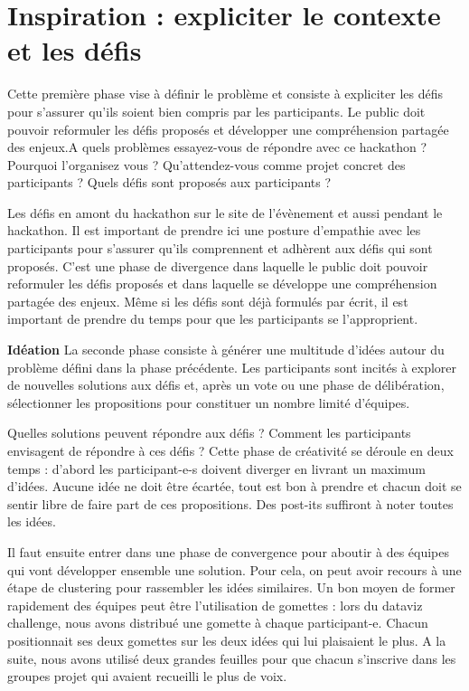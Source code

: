 \documentclass[]{book}
\begin{document}
\section{Inspiration : expliciter le contexte et les
défis}\label{inspiration-expliciter-le-contexte-et-les-defis}

Cette première phase vise à définir le problème et consiste à expliciter
les défis pour s'assurer qu'ils soient bien compris par les
participants. Le public doit pouvoir reformuler les défis proposés et
développer une compréhension partagée des enjeux.A quels problèmes
essayez-vous de répondre avec ce hackathon ? Pourquoi l'organisez vous ?
Qu'attendez-vous comme projet concret des participants ? Quels défis
sont proposés aux participants ?

Les défis en amont du hackathon sur le site de l'évènement et aussi
pendant le hackathon. Il est important de prendre ici une posture
d'empathie avec les participants pour s'assurer qu'ils comprennent et
adhèrent aux défis qui sont proposés. C'est une phase de divergence dans
laquelle le public doit pouvoir reformuler les défis proposés et dans
laquelle se développe une compréhension partagée des enjeux. Même si les
défis sont déjà formulés par écrit, il est important de prendre du temps
pour que les participants se l'approprient.

\textbf{Idéation} La seconde phase consiste à générer une multitude
d'idées autour du problème défini dans la phase précédente. Les
participants sont incités à explorer de nouvelles solutions aux défis
et, après un vote ou une phase de délibération, sélectionner les
propositions pour constituer un nombre limité d'équipes.

Quelles solutions peuvent répondre aux défis ? Comment les participants
envisagent de répondre à ces défis ? Cette phase de créativité se
déroule en deux temps : d'abord les participant-e-s doivent diverger en
livrant un maximum d'idées. Aucune idée ne doit être écartée, tout est
bon à prendre et chacun doit se sentir libre de faire part de ces
propositions. Des post-its suffiront à noter toutes les idées.

Il faut ensuite entrer dans une phase de convergence pour aboutir à des
équipes qui vont développer ensemble une solution. Pour cela, on peut
avoir recours à une étape de clustering pour rassembler les idées
similaires. Un bon moyen de former rapidement des équipes peut être
l'utilisation de gomettes : lors du dataviz challenge, nous avons
distribué une gomette à chaque participant-e. Chacun positionnait ses
deux gomettes sur les deux idées qui lui plaisaient le plus. A la suite,
nous avons utilisé deux grandes feuilles pour que chacun s'inscrive dans
les groupes projet qui avaient recueilli le plus de voix.
\end{document}
